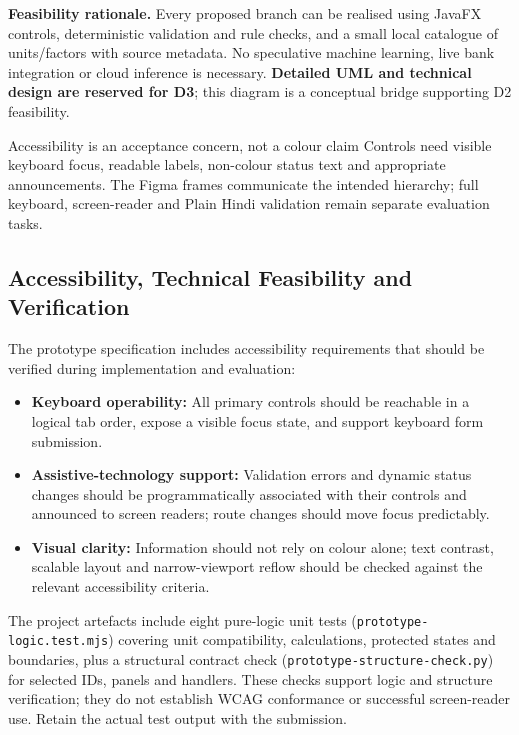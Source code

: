 \documentclass[12pt,a4paper]{article}
\newcommand{\code}[1]{\texttt{#1}}
\begin{document}
\begin{keybox}
\textbf{Feasibility rationale.} Every proposed branch can be realised using JavaFX controls, deterministic validation and rule checks, and a small local catalogue of units/factors with source metadata. No speculative machine learning, live bank integration or cloud inference is necessary. \textbf{Detailed UML and technical design are reserved for D3}; this diagram is a conceptual bridge supporting D2 feasibility.
\end{keybox}

\begin{chapterfocus}{Accessibility is an acceptance concern, not a colour claim}
Controls need visible keyboard focus, readable labels, non-colour status text and appropriate announcements. The Figma frames communicate the intended hierarchy; full keyboard, screen-reader and Plain Hindi validation remain separate evaluation tasks.
\end{chapterfocus}

\subsection{Accessibility, Technical Feasibility and Verification}
The prototype specification includes accessibility requirements that should be verified during implementation and evaluation:
\begin{itemize}[leftmargin=*]
  \item \textbf{Keyboard operability:} All primary controls should be reachable in a logical tab order, expose a visible focus state, and support keyboard form submission.
  \item \textbf{Assistive-technology support:} Validation errors and dynamic status changes should be programmatically associated with their controls and announced to screen readers; route changes should move focus predictably.
  \item \textbf{Visual clarity:} Information should not rely on colour alone; text contrast, scalable layout and narrow-viewport reflow should be checked against the relevant accessibility criteria.
\end{itemize}
The project artefacts include eight pure-logic unit tests (\code{prototype-logic.test.mjs}) covering unit compatibility, calculations, protected states and boundaries, plus a structural contract check (\code{prototype-structure-check.py}) for selected IDs, panels and handlers. These checks support logic and structure verification; they do not establish WCAG conformance or successful screen-reader use. Retain the actual test output with the submission.
\end{document}
